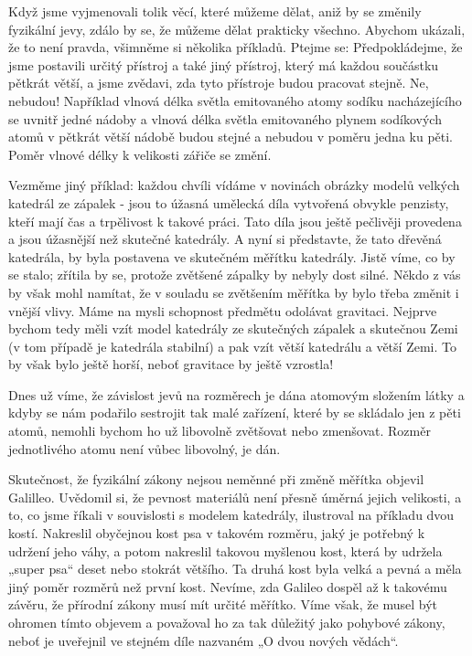     Když jsme vyjmenovali tolik věcí, které můžeme dělat, aniž by se změnily fyzikální jevy, zdálo
    by se, že můžeme dělat prakticky všechno. Abychom ukázali, že to není pravda, všimněme si
    několika příkladů. Ptejme se:  
    Předpokládejme, že jsme postavili určitý přístroj a také jiný přístroj, který má každou
    součástku pětkrát větší, a jsme zvědavi, zda tyto přístroje budou pracovat stejně. Ne, nebudou!
    Například vlnová délka světla emitovaného atomy sodíku nacházejícího se uvnitř jedné nádoby a
    vlnová délka světla emitovaného plynem sodíkových atomů v pětkrát větší nádobě budou stejné a
    nebudou v poměru jedna ku pěti. Poměr vlnové délky k velikosti zářiče se změní.

    Vezměme jiný příklad: každou chvíli vídáme v novinách obrázky modelů velkých katedrál ze zápalek
    - jsou to úžasná umělecká díla vytvořená obvykle penzisty, kteří mají čas a trpělivost k takové
    práci. Tato díla jsou ještě pečlivěji provedena a jsou úžasnější než skutečné katedrály. A nyní
    si představte, že tato dřevěná katedrála, by byla postavena ve skutečném měřítku katedrály.
    Jistě víme, co by se stalo; zřítila by se, protože zvětšené zápalky by nebyly dost silné. Někdo
    z vás by však mohl namítat, že v souladu se zvětšením měřítka by bylo třeba změnit i vnější
    vlivy. Máme na mysli schopnost předmětu odolávat gravitaci. Nejprve bychom tedy měli vzít model
    katedrály ze skutečných zápalek a skutečnou Zemi (v tom případě je katedrála stabilní) a pak
    vzít větší katedrálu a větší Zemi. To by však bylo ještě horší, neboť gravitace by ještě
    vzrostla!

    Dnes už víme, že závislost jevů na rozměrech je dána atomovým složením látky a kdyby se nám
    podařilo sestrojit tak malé zařízení, které by se skládalo jen z pěti atomů, nemohli bychom ho
    už libovolně zvětšovat nebo zmenšovat. Rozměr jednotlivého atomu není vůbec libovolný, je dán.

    Skutečnost, že fyzikální zákony nejsou neměnné při změně měřítka objevil Galilleo.  Uvědomil si,
    že pevnost materiálů není přesně úměrná jejich velikosti, a to, co jsme říkali v souvislosti s
    modelem katedrály, ilustroval na příkladu dvou kostí. Nakreslil obyčejnou kost psa v takovém
    rozměru, jaký je potřebný k udržení jeho váhy, a potom nakreslil takovou myšlenou kost, která by
    udržela „super psa“ deset nebo stokrát většího. Ta druhá kost byla velká a pevná a měla jiný
    poměr rozměrů než první kost. Nevíme, zda Galileo dospěl až k takovému závěru, že přírodní
    zákony musí mít určité měřítko. Víme však, že musel být ohromen tímto objevem a považoval ho za
    tak důležitý jako pohybové zákony, neboť je uveřejnil ve stejném díle nazvaném „O dvou nových
    vědách“.

